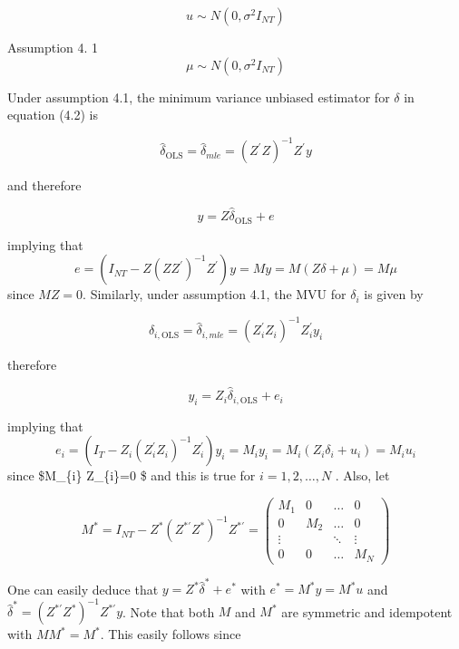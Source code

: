 \documentclass[
]{book}
\begin{document}
\[ u \sim N\left(0, \sigma^{2} I_{N T}\right)\]

Assumption 4. 1 \[\mu   \sim N\left(0, \sigma^{2} I_{N T}\right)\]

Under assumption 4.1, the minimum variance unbiased estimator for \(\delta\) in equation (4.2) is

\begin{equation}
\widehat{\delta}_{\mathrm{OLS}}=\widehat{\delta}_{m l e}=\left(Z^{\prime} Z\right)^{-1} Z^{\prime} y
\end{equation}

and therefore

\begin{equation}
y=Z \widehat{\delta}_{\mathrm{OLS}}+e
\end{equation}

implying that \[e=\left(I_{NT}-Z \left(Z Z^{\prime}\right)^{-1}Z^{\prime}\right)y =My=M\left(Z\delta +\mu \right)= M \mu \] since \(MZ=0\). Similarly,
under assumption 4.1, the MVU for \(\delta_i\) is given by

\begin{equation}
\widehat{\delta}_{i, \mathrm{OLS}}=\widehat{\delta}_{i, m l e}=\left(Z_{i}^{\prime} Z_{i}\right)^{-1} Z_{i}^{\prime} y_{i}
\end{equation}

therefore

\begin{equation}
y_{i}=Z_{i} \widehat{\delta}_{i, \mathrm{OLS}}+e_{i}
\end{equation}

implying that \[ e_{i}=\left(I_{T}-Z_{i}\left(Z_{i}^{\prime} Z_{i}\right)^{-1} Z_{i}^{\prime}\right) y_{i}=M_{i} y_{i}=M_{i}\left(Z_{i} \delta_{i}+u_{i}\right)=M_{i} u_{i}\] since \$M\_\{i\} Z\_\{i\}=0 \$ and this is true for \(i=1,2, \ldots, N\) . Also, let

\[
M^{*}=I_{N T}-Z^{*}\left(Z^{* \prime} Z^{*}\right)^{-1} Z^{* \prime}=\left(\begin{array}{cccc}
M_{1} & 0 & \ldots & 0 \\
0 & M_{2} & \ldots & 0 \\
\vdots & & \ddots & \vdots \\
0 & 0 & \ldots & M_{N}
\end{array}\right)
\]

One can easily deduce that \(y=Z^{*} \widehat{\delta}^{*}+e^{*}\) with \(e^{*}=M^{*} y=M^{*} u\) and \(\widehat{\delta}^{*}=\left(Z^{* \prime} Z^{*}\right)^{-1} Z^{* \prime} y\).
Note that both \(M\) and \(M^{*}\) are symmetric and idempotent with \(M M^{*}=M^{*}\). This easily follows since
\end{document}
